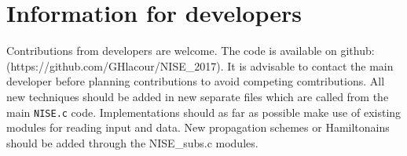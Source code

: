 \chapter{Information for developers\label{chap:developers}}
Contributions from developers are welcome. The code is available on
github:\\ (https://github.com/GHlacour/NISE\_2017). It is advisable to contact the main developer before planning contributions to avoid competing comtributions. All new techniques should be added in new separate files which are called from the main {\tt NISE.c} code. Implementations should as far as possible make use of existing modules for reading input and data. New propagation schemes or Hamiltonains should be added through the {NISE\_subs.c} modules.

